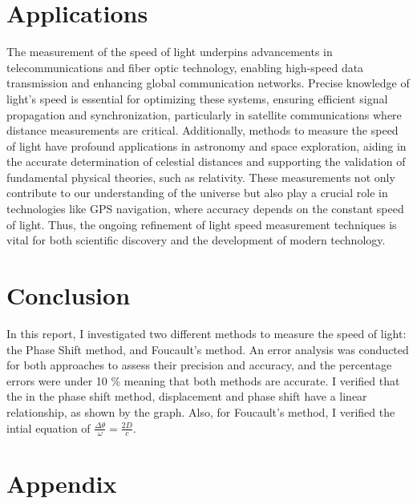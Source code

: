 \documentclass[12pt]{article}
\begin{document}
	\section{Applications}
	
	The measurement of the speed of light underpins advancements in telecommunications and fiber optic technology, enabling high-speed data transmission and enhancing global communication networks. Precise knowledge of light's speed is essential for optimizing these systems, ensuring efficient signal propagation and synchronization, particularly in satellite communications where distance measurements are critical. Additionally, methods to measure the speed of light have profound applications in astronomy and space exploration, aiding in the accurate determination of celestial distances and supporting the validation of fundamental physical theories, such as relativity. These measurements not only contribute to our understanding of the universe but also play a crucial role in technologies like GPS navigation, where accuracy depends on the constant speed of light. Thus, the ongoing refinement of light speed measurement techniques is vital for both scientific discovery and the development of modern technology.

\clearpage

	\section{Conclusion}
	
	In this report, I investigated two different methods to measure the speed of light: the Phase Shift method, and Foucault's method. An error analysis was conducted for both approaches to assess their precision and accuracy, and the percentage errors were under 10 \% meaning that both methods are accurate. I verified that the in the phase shift method, displacement and phase shift have a linear relationship, as shown by the graph. Also, for Foucault's method, I verified the intial equation of $\frac{\Delta \theta}{\omega} = \frac{2D}{c}$.

\clearpage

	\section{Appendix}
	
\end{document}
